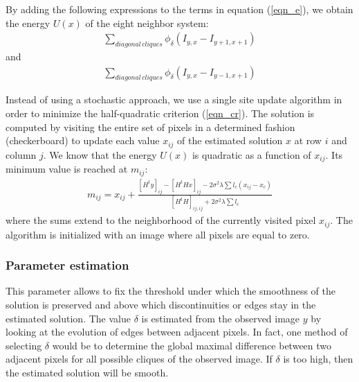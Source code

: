 By adding the following expressions to the terms in equation (\ref{eqn_e}), we
obtain the energy $U({x})$ of the eight neighbor system:
\begin{eqnarray} 
\sum_{diagonal\, cliques} \phi_{\delta}(I_{y,x}- I_{y+1,x+1})
\end{eqnarray}
and 
\begin{eqnarray} 
\sum_{diagonal\, cliques} \phi_{\delta}(I_{y,x}- I_{y-1,x+1})
\end{eqnarray}

Instead of using a stochastic approach, we use a single site update algorithm 
\cite{Brette96} in order
to minimize the half-quadratic criterion (\ref{eqn_cr}).
The solution is computed by visiting the entire set of pixels in a determined
fashion (checkerboard) to update each value $x_{ij}$ of the estimated solution
$x$ at row $i$ and column $j$.
We know that the energy $U(x)$ is quadratic as a function of $x_{ij}$.
Its minimum value is reached at $m_{ij}$:
\begin{eqnarray}
m_{ij} = x_{ij} + \frac{[{H^ty}]_{ij} - [{H^tHx}]_{ij} - 2\sigma^2\lambda 
\sum l_c(x_{ij}-x_c)}{[{H^tH}]_{ij,ij} + 2\sigma^2\lambda\sum l_c}
\label{eqn_corr}
\end{eqnarray} 
where the sums extend to the neighborhood of the currently visited pixel $x_{ij}$.
The algorithm is initialized with an image where all pixels are equal to zero.

\subsubsection*{Parameter estimation}


This parameter allows to fix the threshold under which the smoothness of the
solution is preserved and above which discontinuities or edges stay in the
estimated solution.
The value $\delta$ is estimated from the observed image $y$ by looking at the
evolution of edges between adjacent pixels. In fact, one method of selecting
$\delta$
would be to determine the global maximal difference between two adjacent pixels 
for all possible cliques of the observed image.
If $\delta$ is too high, then the estimated solution will be smooth.


